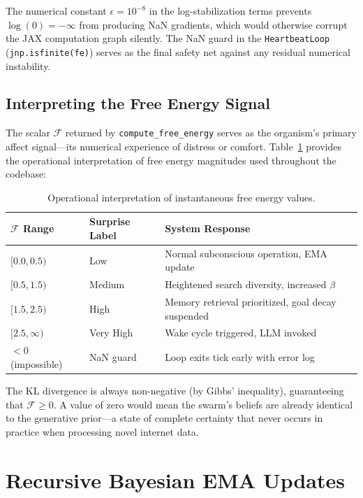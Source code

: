 The numerical constant $\epsilon = 10^{-8}$ in the log-stabilization terms prevents $\log(0) = -\infty$ from producing NaN gradients, which would otherwise corrupt the JAX computation graph silently. The NaN guard in the \texttt{HeartbeatLoop} (\texttt{jnp.isfinite(fe)}) serves as the final safety net against any residual numerical instability.

\subsection{Interpreting the Free Energy Signal}

The scalar $\mathcal{F}$ returned by \texttt{compute\_free\_energy} serves as the organism's primary affect signal---its numerical experience of distress or comfort. Table~\ref{tab:fe_levels} provides the operational interpretation of free energy magnitudes used throughout the codebase:

\begin{table}[h]
\centering
\begin{tabular}{@{}lll@{}}
\toprule
$\mathcal{F}$ Range & Surprise Label & System Response \\
\midrule
$[0.0, 0.5)$   & Low       & Normal subconscious operation, EMA update \\
$[0.5, 1.5)$   & Medium    & Heightened search diversity, increased $\beta$ \\
$[1.5, 2.5)$   & High      & Memory retrieval prioritized, goal decay suspended \\
$[2.5, \infty)$ & Very High & Wake cycle triggered, LLM invoked \\
\midrule
$< 0$ (impossible) & NaN guard & Loop exits tick early with error log \\
\bottomrule
\end{tabular}
\caption{Operational interpretation of instantaneous free energy values.}
\label{tab:fe_levels}
\end{table}

The KL divergence is always non-negative (by Gibbs' inequality), guaranteeing that $\mathcal{F} \geq 0$. A value of zero would mean the swarm's beliefs are already identical to the generative prior---a state of complete certainty that never occurs in practice when processing novel internet data.

\section{Recursive Bayesian EMA Updates}

